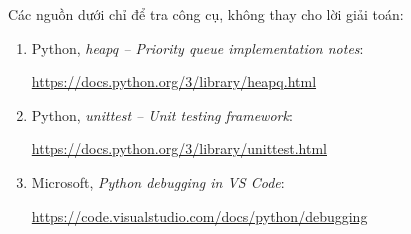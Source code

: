 \documentclass[11pt,a4paper]{article}
\begin{document}
Các nguồn dưới chỉ để tra công cụ, không thay cho lời giải toán:
\begin{enumerate}[label=\arabic*.]
\item Python, \emph{heapq -- Priority queue implementation notes}:\par
\url{https://docs.python.org/3/library/heapq.html}
\item Python, \emph{unittest -- Unit testing framework}:\par
\url{https://docs.python.org/3/library/unittest.html}
\item Microsoft, \emph{Python debugging in VS Code}:\par
\url{https://code.visualstudio.com/docs/python/debugging}
\end{enumerate}
\end{document}
